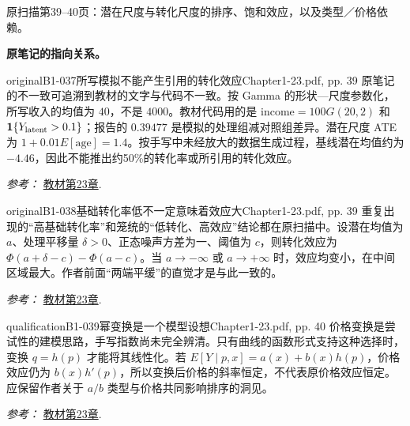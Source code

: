 {\begin{center}
\begin{tikzpicture}[>=Stealth, font=\small, line width=.65pt]
\end{tikzpicture}
\par{\small 原扫描第39--40页：潜在尺度与转化尺度的排序、饱和效应，以及类型／价格依赖。}
\end{center}
\par{}\smallskip\textbf{原笔记的指向关系。}\par\smallskip
{}
\begin{reviewnote}{original}{B1-037}{所写模拟不能产生引用的转化效应}{Chapter1-23.pdf, pp. 39}
原笔记的不一致可追溯到教材的文字与代码不一致。按 Gamma 的形状—尺度参数化，所写收入的均值为 $40$，不是 $4000$。教材代码用的是 $\mathrm{income}=100G(20,2)$ 和 $\mathbf1\{Y_{\rm latent}>0.1\}$；报告的 $0.39477$ 是模拟的处理组减对照组差异。潜在尺度 ATE 为 $1+0.01E[\mathrm{age}]=1.4$。按手写中未经放大的数据生成过程，基线潜在均值约为 $-4.46$，因此不能推出约50\%的转化率或所引用的转化效应。
\par\smallskip\textit{参考：} \href{https://matheusfacure.github.io/python-causality-handbook/23-Challenges-with-Effect-Heterogeneity-and-Nonlinearity.html}{教材第23章}.
\end{reviewnote}

\begin{reviewnote}{original}{B1-038}{基础转化率低不一定意味着效应大}{Chapter1-23.pdf, pp. 39}
重复出现的“高基础转化率”和笼统的“低转化、高效应”结论都在原扫描中。设潜在均值为 $a$、处理平移量 $\delta>0$、正态噪声方差为一、阈值为 $c$，则转化效应为 $\Phi(a+\delta-c)-\Phi(a-c)$。当 $a\to-\infty$ 或 $a\to+\infty$ 时，效应均变小，在中间区域最大。作者前面“两端平缓”的直觉才是与此一致的。
\par\smallskip\textit{参考：} \href{https://matheusfacure.github.io/python-causality-handbook/23-Challenges-with-Effect-Heterogeneity-and-Nonlinearity.html}{教材第23章}.
\end{reviewnote}

\begin{reviewnote}{qualification}{B1-039}{幂变换是一个模型设想}{Chapter1-23.pdf, pp. 40}
价格变换是尝试性的建模思路，手写指数尚未完全辨清。只有曲线的函数形式支持这种选择时，变换 $q=h(p)$ 才能将其线性化。若 $E[Y\mid p,x]=a(x)+b(x)h(p)$，价格效应仍为 $b(x)h'(p)$，所以变换后价格的斜率恒定，不代表原价格效应恒定。应保留作者关于 $a/b$ 类型与价格共同影响排序的洞见。
\par\smallskip\textit{参考：} \href{https://matheusfacure.github.io/python-causality-handbook/23-Challenges-with-Effect-Heterogeneity-and-Nonlinearity.html}{教材第23章}.
\end{reviewnote}

}
